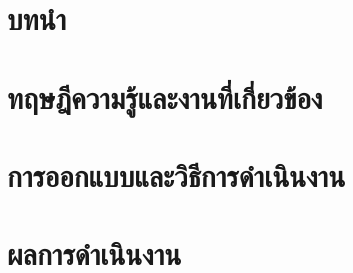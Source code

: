 \documentclass[a4paper,oneside]{cpe-thesis-th}
\begin{document}


\chapter{บทนำ}






\chapter{ทฤษฎีความรู้และงานที่เกี่ยวข้อง}






\chapter{การออกแบบและวิธีการดำเนินงาน}










\chapter{ผลการดำเนินงาน}








\end{document}
